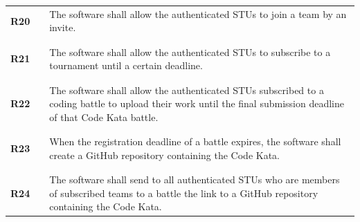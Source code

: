 \begin{longtable}[H]{l l p{12cm}}
    \textbf{R20} & \vline & The software shall allow the authenticated STUs to join a team by an invite.                                                                                                                                          \\
                 &        &                                                                                                                                                                                                                       \\\hline & & \\
    \textbf{R21} & \vline & The software shall allow the authenticated STUs to subscribe to a tournament until a certain deadline.                                                                                                                \\
                 &        &                                                                                                                                                                                                                       \\\hline & & \\
    \textbf{R22} & \vline & The software shall allow the authenticated STUs subscribed to a coding battle to upload their work until the final submission deadline of that Code Kata battle.                                                      \\
                 &        &                                                                                                                                                                                                                       \\\hline & & \\
    \textbf{R23} & \vline & When the registration deadline of a battle expires, the software shall create a GitHub repository containing the Code Kata.                                                                                           \\
                 &        &                                                                                                                                                                                                                       \\\hline & & \\
    \textbf{R24} & \vline & The software shall send to all authenticated STUs who are members of subscribed teams to a battle the link to a GitHub repository containing the Code Kata.                                                           \\

\end{longtable}
